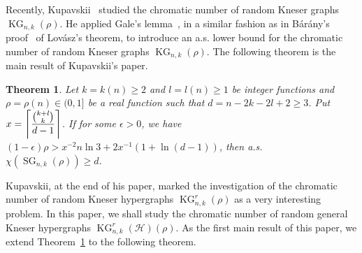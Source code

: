 \documentclass[11pt]{amsart}
\newtheorem{alphtheorem}{Theorem}
\theoremstyle{definition}
\theoremstyle{remark}
\def\ds{\displaystyle}
\def\KG{\operatorname{KG}}
\def\SG{\operatorname{SG}}
\begin{document}
Recently, Kupavskii~\cite{MR3479235} studied 
the chromatic number of random Kneser graphs $\KG_{n,k}(\rho)$. 
He applied Gale's lemma~\cite{MR0085552},  in a similar fashion as in B{\'a}r{\'a}ny's proof~\cite{MR514626} of Lov\'asz's theorem, 
to introduce an a.s. lower bound for the chromatic number of random Kneser graphs $\KG_{n,k}(\rho)$. 
The following theorem is the main result of Kupavskii's paper.
\begin{alphtheorem}{\rm\cite{MR3479235}}\label{Kupavskiimain}
Let $k=k(n)\geq 2$ and $l=l(n)\geq 1$ be integer functions and $\rho=\rho(n)\in(0,1]$ 
be a real function such that  $d=n-2k-2l+2\geq 3$. Put $x=\ds\left\lceil{{k+l\choose k}\over d-1}\right\rceil$. If for some $\epsilon>0$, we have $(1-\epsilon)\rho>x^{-2}n\ln 3+2x^{-1}(1+\ln(d-1))$, then 
a.s. $\chi(\SG_{n,k}(\rho))\geq d$.
\end{alphtheorem}
Kupavskii, at the end of his paper, marked the investigation of the chromatic 
number of random Kneser hypergraphs $\KG^r_{n,k}(\rho)$ as a very interesting problem. 
In this paper, we shall study the chromatic number of random general Kneser hypergraphs  $\KG^r_{n,k}(\mathcal{H})(\rho)$.
As the first main result of this paper, we extend Theorem~\ref{Kupavskiimain} 
to the following theorem. 
\end{document}

